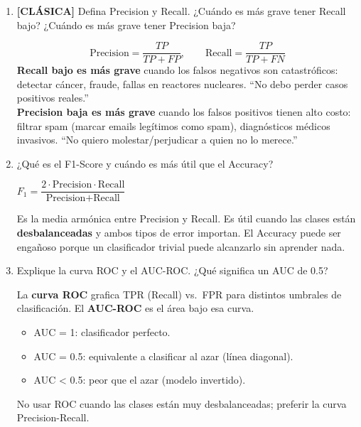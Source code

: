\documentclass[11pt,a4paper]{article}
\begin{document}
\begin{enumerate}[label=\textbf{P\arabic*.}, resume]

\item \leavevmode

\begin{classicbox}
\textcolor{tdred}{\textbf{[CL\'ASICA]}} Defina Precision y Recall. ¿Cu\'ando es m\'as
grave tener Recall bajo? ¿Cu\'ando es m\'as grave tener Precision baja?
\end{classicbox}

\begin{answerbox}
\[
  \text{Precision} = \frac{TP}{TP+FP}, \qquad \text{Recall} = \frac{TP}{TP+FN}
\]
\textbf{Recall bajo es m\'as grave} cuando los falsos negativos son catastr\'oficos:
detectar c\'ancer, fraude, fallas en reactores nucleares. ``No debo perder casos
positivos reales.''\\[4pt]
\textbf{Precision baja es m\'as grave} cuando los falsos positivos tienen alto costo:
filtrar spam (marcar emails leg\'itimos como spam), diagn\'osticos m\'edicos invasivos.
``No quiero molestar/perjudicar a quien no lo merece.''
\end{answerbox}

\item ¿Qu\'e es el F1-Score y cu\'ando es m\'as \'util que el Accuracy?

\begin{answerbox}
$F_1 = \dfrac{2 \cdot \text{Precision} \cdot \text{Recall}}{\text{Precision}+\text{Recall}}$

Es la media arm\'onica entre Precision y Recall. Es \'util cuando las clases est\'an
\textbf{desbalanceadas} y ambos tipos de error importan. El Accuracy puede ser enga\~noso
porque un clasificador trivial puede alcanzarlo sin aprender nada.
\end{answerbox}

\item Explique la curva ROC y el AUC-ROC. ¿Qu\'e significa un AUC de 0.5?

\begin{answerbox}
La \textbf{curva ROC} grafica TPR (Recall) vs.\ FPR para distintos umbrales de
clasificaci\'on. El \textbf{AUC-ROC} es el \'area bajo esa curva.\\
\begin{itemize}[topsep=2pt, itemsep=2pt]
  \item AUC = 1: clasificador perfecto.
  \item AUC = 0.5: equivalente a clasificar al azar (l\'inea diagonal).
  \item AUC < 0.5: peor que el azar (modelo invertido).
\end{itemize}
No usar ROC cuando las clases est\'an muy desbalanceadas; preferir la curva
Precision-Recall.
\end{answerbox}


\end{enumerate}
\end{document}
